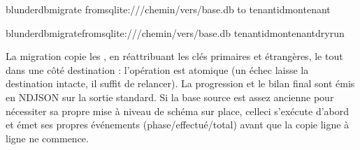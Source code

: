 \documentclass[letterpaper,10pt,finnish]{sphinxmanual}
\begin{document}
\begin{sphinxVerbatim}[commandchars=\\\{\}]
blunderdbmigrate
\PYGZhy{}\PYGZhy{}fromsqlite:///chemin/vers/base.db
\PYGZhy{}\PYGZhy{}to
\PYGZhy{}\PYGZhy{}tenant\PYGZhy{}idmon\PYGZhy{}tenant

blunderdbmigrate\PYGZhy{}\PYGZhy{}fromsqlite:///chemin/vers/base.db
\PYGZhy{}\PYGZhy{}tenant\PYGZhy{}idmon\PYGZhy{}tenant\PYGZhy{}\PYGZhy{}dry\PYGZhy{}run
\end{sphinxVerbatim}

\sphinxAtStartPar
La migration copie les , en réattribuant les clés primaires et étrangères, le
tout dans une  côté destination : l’opération est atomique
(un échec laisse la destination intacte, il suffit de relancer). La progression
et le bilan final sont émis en NDJSON sur la sortie standard. Si la base source
est assez ancienne pour nécessiter sa propre mise à niveau de schéma sur place,
celle\sphinxhyphen{}ci s’exécute d’abord et émet ses propres événements
 (phase/effectué/total) avant que la copie ligne à ligne
ne commence.
\end{document}
